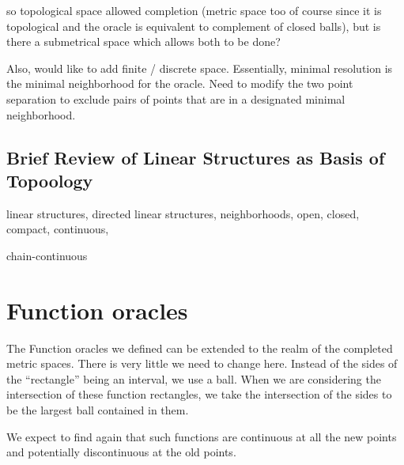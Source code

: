 \documentclass[12pt]{article}
\begin{document}
so topological space allowed completion (metric space too of course since it is topological and the oracle is equivalent to complement of closed balls),  but is there a submetrical space which allows both to be done? 

Also, would like to add finite / discrete space. Essentially, minimal resolution is the minimal neighborhood for the oracle. Need to modify the two point separation to exclude pairs of points that are in a designated minimal neighborhood. 

\subsection{Brief Review of Linear Structures as Basis of Topoology}

linear structures, directed linear structures, neighborhoods, open, closed, compact, continuous, 

chain-continuous



\section{Function oracles}



The Function oracles we defined can be extended to the realm of the completed metric spaces. There is very little we need to change here. Instead of the sides of the ``rectangle'' being an interval, we use a ball. When we are considering the intersection of these function rectangles, we take the intersection of the sides to be the largest ball contained in them. 

We expect to find again that such functions are continuous at all the new points and potentially discontinuous at the old points. 
\end{document}
